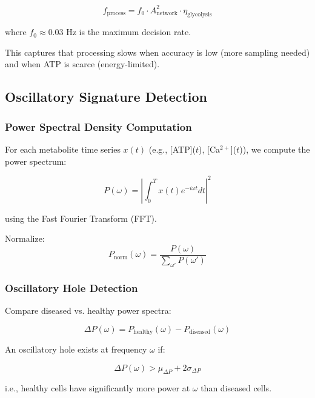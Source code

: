 \documentclass{article}
\begin{document}
\begin{equation}
f_{\text{process}} = f_0 \cdot A_{\text{network}}^2 \cdot \eta_{\text{glycolysis}}
\end{equation}

where $f_0 \approx 0.03$ Hz is the maximum decision rate.

This captures that processing slows when accuracy is low (more sampling needed) and when ATP is scarce (energy-limited).

\subsection{Oscillatory Signature Detection}

\subsubsection{Power Spectral Density Computation}

For each metabolite time series $x(t)$ (e.g., [ATP]($t$), [Ca$^{2+}$]($t$)), we compute the power spectrum:

\begin{equation}
P(\omega) = \left|\int_0^T x(t) e^{-i\omega t} dt\right|^2
\end{equation}

using the Fast Fourier Transform (FFT).

Normalize:
\begin{equation}
P_{\text{norm}}(\omega) = \frac{P(\omega)}{\sum_{\omega'} P(\omega')}
\end{equation}

\subsubsection{Oscillatory Hole Detection}

Compare diseased vs. healthy power spectra:

\begin{equation}
\Delta P(\omega) = P_{\text{healthy}}(\omega) - P_{\text{diseased}}(\omega)
\end{equation}

An oscillatory hole exists at frequency $\omega$ if:

\begin{equation}
\Delta P(\omega) > \mu_{\Delta P} + 2\sigma_{\Delta P}
\end{equation}

i.e., healthy cells have significantly more power at $\omega$ than diseased cells.
\end{document}
